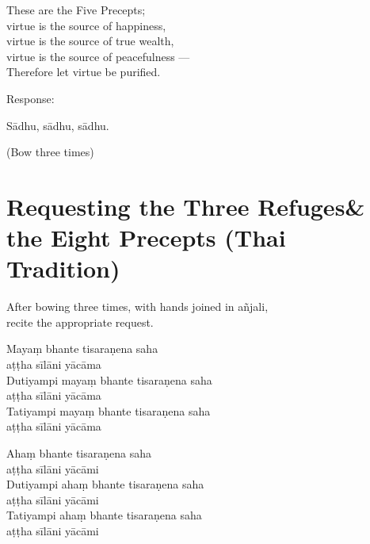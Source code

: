 \begin{english}
  These are the Five Precepts;\\
  virtue is the source of happiness,\\
  virtue is the source of true wealth,\\
  virtue is the source of peacefulness ---\\
  Therefore let virtue be purified.
\end{english}

\begin{instruction}
  Response:
\end{instruction}

Sādhu, sādhu, sādhu.

\begin{instruction}
  (Bow three times)
\end{instruction}

\ifhandbookedition
\clearpage
\fi

\section[Three Refuges \& the Eight Precepts]{Requesting the Three Refuges\newline \& the Eight Precepts (Thai Tradition)}

\label{eight-precepts}

\begin{instruction}
  After bowing three times, with hands joined in añjali,\\
  recite the appropriate request.
\end{instruction}

\ifhandbookedition
\enlargethispage{\baselineskip}
\fi


Mayaṃ bhante tisaraṇena saha\\\vin aṭṭha sīlāni yācāma\\
Dutiyampi mayaṃ bhante tisaraṇena saha\\\vin aṭṭha sīlāni yācāma\\
Tatiyampi mayaṃ bhante tisaraṇena saha\\\vin aṭṭha sīlāni yācāma


Ahaṃ bhante tisaraṇena saha\\\vin aṭṭha sīlāni yācāmi\\
Dutiyampi ahaṃ bhante tisaraṇena saha\\\vin aṭṭha sīlāni yācāmi\\
Tatiyampi ahaṃ bhante tisaraṇena saha\\\vin aṭṭha sīlāni yācāmi

